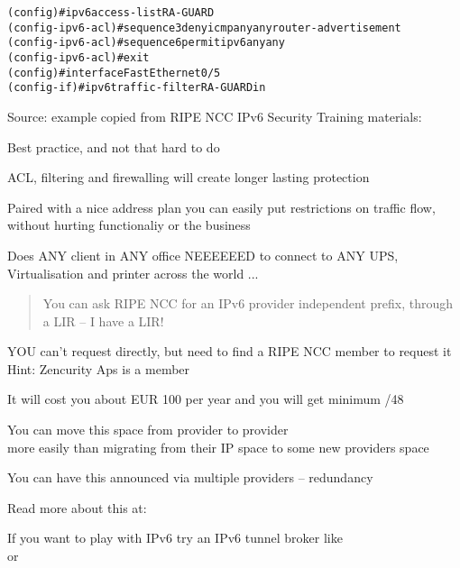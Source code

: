 \documentclass[Screen16to9,17pt]{foils}
\begin{document}


\begin{alltt}
 (config)#ipv6 access-list RA-GUARD
 (config-ipv6-acl)#sequence 3 deny icmp any any router-advertisement
 (config-ipv6-acl)#sequence 6 permit ipv6 any any
 (config-ipv6-acl)#exit
 (config)#interface FastEthernet0/5
 (config-if)#ipv6 traffic-filter RA-GUARD in
\end{alltt}
Source: example copied from RIPE NCC IPv6 Security Training materials:\\

\begin{list2}
\item Best practice, and not that hard to do
\item ACL, filtering and firewalling will create longer lasting protection
\item Paired with a nice address plan you can easily put restrictions on traffic flow, without hurting functionaliy or the business
\item Does ANY client in ANY office NEEEEEED to connect to ANY UPS, Virtualisation and printer across the world ...
\end{list2}



\begin{quote}
You can ask RIPE NCC for an IPv6 provider independent prefix, through a LIR -- I have a LIR!
\end{quote}

\begin{list2}
\item YOU can't request directly, but need to find a RIPE NCC member to request it\\
Hint: Zencurity Aps is a member
\item It will cost you about EUR 100 per year and you will get minimum /48
\item You can move this space from provider to provider\\
more easily than migrating from their IP space to some new providers space
\item You can have this announced via multiple providers -- redundancy
\item Read more about this at:\\
\item If you want to play with IPv6 try an IPv6 tunnel broker like\\
 or 
\end{list2}
\end{document}
